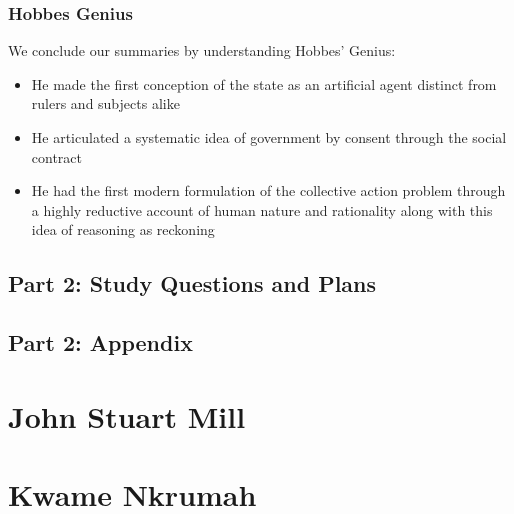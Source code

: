 \documentclass[12pt, letterpaper]{article}
\begin{document}
\subsubsection{Hobbes Genius}
We conclude our summaries by understanding Hobbes' Genius:
\begin{itemize}
	\item He made the first conception of the state as an artificial agent distinct from rulers and subjects alike
	\item He articulated a systematic idea of government by consent through the social contract
	\item He had the first modern formulation of the collective action problem through a highly reductive account of human nature and rationality along with this idea of reasoning as reckoning
\end{itemize}

\subsection{Part 2: Study Questions and Plans}



\subsection{Part 2: Appendix}

\newpage
\section{John Stuart Mill}


\newpage
\section{Kwame Nkrumah}
\end{document}
